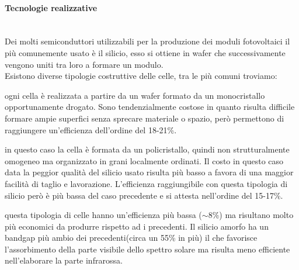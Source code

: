 \paragraph{Tecnologie realizzative}\mbox{}\\
Dei molti semiconduttori utilizzabili per la produzione dei moduli fotovoltaici il più comunemente usato è il silicio, esso si ottiene in wafer che successivamente vengono uniti tra loro a formare un modulo.\\
Esistono diverse tipologie costruttive delle celle, tra le più comuni troviamo:
\begin{description}[labelindent=5mm]
    \item[$\cdot$ Silicio monocristallino:] ogni cella è realizzata a partire da un wafer formato da un monocristallo opportunamente drogato. Sono tendenzialmente costose in quanto risulta difficile formare ampie superfici senza sprecare materiale o spazio, però permettono di raggiungere un'efficienza dell'ordine del 18-21\%.
    \item[$\cdot$ Silicio policristallino:] in questo caso la cella è formata da un policristallo, quindi non strutturalmente omogeneo ma organizzato in grani localmente ordinati. Il costo in questo caso data la peggior qualità del silicio usato risulta più basso a favora di una maggior facilità di taglio e lavorazione. L'efficienza raggiungibile con questa tipologia di silicio però è più bassa del caso precedente e si attesta nell'ordine del 15-17\%. 
    \item[$\cdot$ Silicio amorfo:] questa tipologia di celle hanno un'efficienza più bassa ($\sim8\%$) ma risultano molto più economici da produrre rispetto ad i precedenti. Il silicio amorfo ha un bandgap più ambio dei precedenti(circa un 55\% in più) il che favorisce l'assorbimento della parte visibile dello spettro solare ma risulta meno efficiente nell'elaborare la parte infrarossa.
\end{description}
